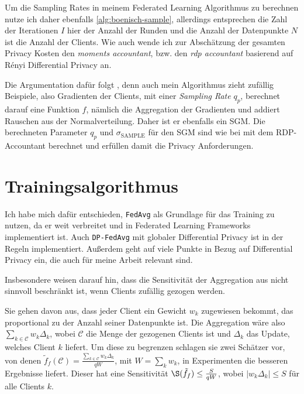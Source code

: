 Um die Sampling Rates in meinem Federated Learning Algorithmus zu berechnen nutze ich daher ebenfalls \autoref{alg:boenisch-sample}, allerdings entsprechen die Zahl der Iterationen $I$ hier der Anzahl der Runden und die Anzahl der Datenpunkte $N$ ist die Anzahl der Clients. Wie auch \textcite{mcmahan:2018, boenisch:2023} wende ich zur Abschätzung der gesamten Privacy Kosten den \textit{moments accountant}, bzw. den \textit{rdp accountant} \cite{wang:2020} basierend auf Rényi Differential Privacy \cite{mironov:2017} an.

Die Argumentation dafür folgt \textcite{boenisch:2023}, denn auch mein Algorithmus zieht zufällig Beispiele, also Gradienten der Clients, mit einer \textit{Sampling Rate} $q_p$, berechnet darauf eine Funktion $f$, nämlich die Aggregation der Gradienten und addiert Rauschen aus der Normalverteilung. Daher ist er ebenfalls ein SGM. Die berechneten Parameter $q_p$ und $\sigma_{\text{SAMPLE}}$ für den SGM sind wie bei \citeauthor{boenisch:2023} mit dem RDP-Accountant berechnet und erfüllen damit die Privacy Anforderungen.

\section{Trainingsalgorithmus}
Ich habe mich dafür entschieden, \texttt{FedAvg} als Grundlage für das Training zu nutzen, da er weit verbreitet und in Federated Learning Frameworks implementiert ist. Auch \texttt{DP-FedAvg} mit globaler Differential Privacy \cite{mcmahan:2018} ist in der Regeln implementiert. Außerdem geht \textcite{mcmahan:2018} auf viele Punkte in Bezug auf Differential Privacy ein, die auch für meine Arbeit relevant sind. 

Insbesondere weisen \citeauthor{mcmahan:2018} darauf hin, dass die Sensitivität der Aggregation aus nicht sinnvoll beschränkt ist, wenn Clients zufällig gezogen werden. 

Sie gehen davon aus, dass jeder Client ein Gewicht $w_k$ zugewiesen bekommt, das proportional zu der Anzahl seiner Datenpunkte ist. Die Aggregation wäre also $\sum_{k \in \mathcal{C}} w_k \Delta_k$, wobei $\mathcal{C}$ die Menge der gezogenen Clients ist und $\Delta_k$ das Update, welches Client $k$ liefert. Um diese zu begrenzen schlagen sie zwei Schätzer vor, von denen $\tilde{f}_f(\mathcal{C}) = \frac{\sum_{k \in \mathcal{C}} w_k \Delta_k}{qW}$, mit $W = \sum_k{w_k}$, in Experimenten die besseren Ergebnisse liefert. Dieser hat eine Sensitivität $\S(\tilde{f}_f) \leq \frac{S}{qW}$, wobei $|w_k \Delta_k| \leq S$ für alle Clients $k$.

